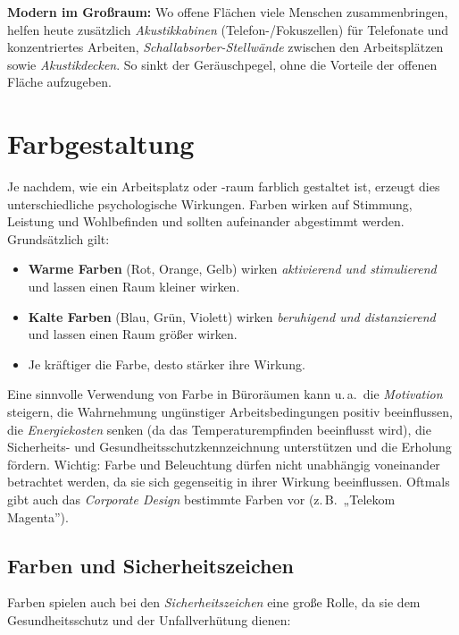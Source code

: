 \documentclass[11pt, a4paper]{article}
\begin{document}
\begin{beispiel}
\textbf{Modern im Großraum:} Wo offene Flächen viele Menschen zusammenbringen, helfen
heute zusätzlich \emph{Akustikkabinen} (Telefon-/Fokuszellen) für Telefonate und
konzentriertes Arbeiten, \emph{Schallabsorber-Stellwände} zwischen den Arbeitsplätzen
sowie \emph{Akustikdecken}. So sinkt der Geräuschpegel, ohne die Vorteile der offenen
Fläche aufzugeben.
\end{beispiel}

\section{Farbgestaltung}

Je nachdem, wie ein Arbeitsplatz oder -raum farblich gestaltet ist, erzeugt dies
unterschiedliche psychologische Wirkungen. Farben wirken auf Stimmung, Leistung und
Wohlbefinden und sollten aufeinander abgestimmt werden. Grundsätzlich gilt:

\begin{itemize}
  \item \textbf{Warme Farben} (Rot, Orange, Gelb) wirken \emph{aktivierend und
    stimulierend} und lassen einen Raum kleiner wirken.
  \item \textbf{Kalte Farben} (Blau, Grün, Violett) wirken \emph{beruhigend und
    distanzierend} und lassen einen Raum größer wirken.
  \item Je kräftiger die Farbe, desto stärker ihre Wirkung.
\end{itemize}

Eine sinnvolle Verwendung von Farbe in Büroräumen kann u.\,a.\ die \emph{Motivation}
steigern, die Wahrnehmung ungünstiger Arbeitsbedingungen positiv beeinflussen, die
\emph{Energiekosten} senken (da das Temperaturempfinden beeinflusst wird), die
Sicherheits- und Gesundheitsschutzkennzeichnung unterstützen und die Erholung fördern.
Wichtig: Farbe und Beleuchtung dürfen nicht unabhängig voneinander betrachtet werden, da
sie sich gegenseitig in ihrer Wirkung beeinflussen. Oftmals gibt auch das
\emph{Corporate Design} bestimmte Farben vor (z.\,B.\ „Telekom Magenta”).

\subsection{Farben und Sicherheitszeichen}

Farben spielen auch bei den \emph{Sicherheitszeichen} eine große Rolle, da sie dem
Gesundheitsschutz und der Unfallverhütung dienen:
\end{document}
